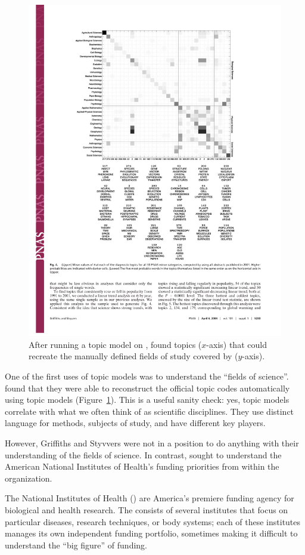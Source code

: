 \begin{figure}
  \includegraphics[width=.8\linewidth]{figures/sci_gs}
  \caption{After running a topic model on ,
    \citet{griffiths-04} found topics ($x$-axis) that could recreate
    the manually defined fields of study covered by 
    ($y$-axis).}
\label{fig:pnas}
\end{figure}

One of the first uses of topic models was to understand the ``fields
of science''.  \citet{griffiths-04} found that they were able to
reconstruct the official  topic codes automatically using
topic models (Figure~\ref{fig:pnas}).  This is a useful sanity check:
yes, topic models correlate with what we often think of as scientific
disciplines.  They use distinct language for methods, subjects of
study, and have different key players.

However, Griffiths and Styvvers were not in a position to do anything
with their understanding of the fields of science.  In contrast,
\citet{talley-11} sought to understand the American National Institutes
of Health's funding priorities from within the organization.

The National Institutes of Health () are America's premiere funding
agency for biological and health research.  The  consists of
several institutes that focus on particular diseases, research techniques, or body
systems; each of these institutes manages its own independent funding portfolio,
sometimes making it difficult to understand the ``big figure'' of funding.

